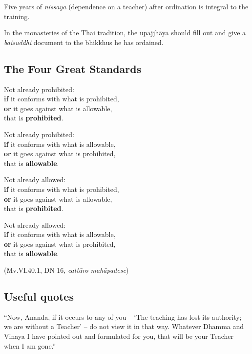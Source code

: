 
Five years of \emph{nissaya} (dependence on a teacher) after ordination
is integral to the training.

In the monasteries of the Thai tradition, the upajjhāya should fill out
and give a \emph{baisuddhi} document to the bhikkhus he has ordained.

\subsection{The Four Great Standards}

\enlargethispage*{\baselineskip}
\begin{multicols}{2}

Not already prohibited:\\
\textbf{if} it conforms with what is prohibited,\\
\textbf{or} it goes against what is allowable,\\
that is \textbf{prohibited}.

Not already prohibited:\\
\textbf{if} it conforms with what is allowable,\\
\textbf{or} it goes against what is prohibited,\\
that is \textbf{allowable}.

\columnbreak

Not already allowed:\\
\textbf{if} it conforms with what is prohibited,\\
\textbf{or} it goes against what is allowable,\\
that is \textbf{prohibited}.

Not already allowed:\\
\textbf{if} it conforms with what is allowable,\\
\textbf{or} it goes against what is prohibited,\\
that is \textbf{allowable}.

\end{multicols}

(Mv.VI.40.1, DN 16, \emph{cattāro mahāpadese})

\clearpage

\subsection{Useful quotes}

``Now, Ananda, if it occurs to any of you -- `The teaching has lost its
authority; we are without a Teacher' -- do not view it in that way.
Whatever Dhamma and Vinaya I have pointed out and formulated for you,
that will be your Teacher when I am gone.''

